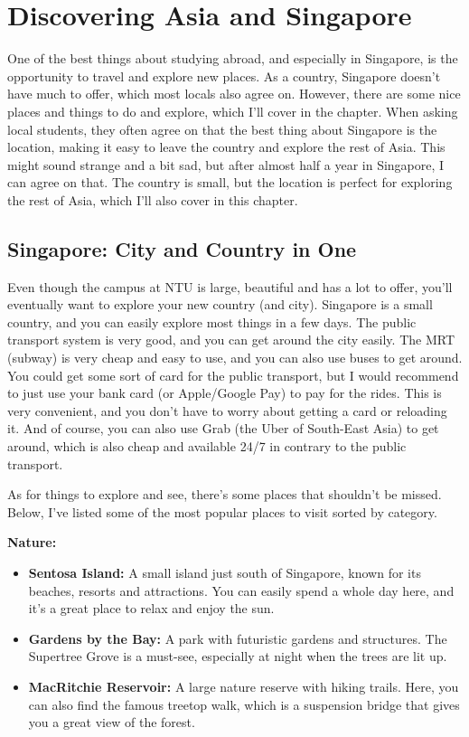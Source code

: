 \chapter*{Discovering Asia and Singapore}
\label{discover}

One of the best things about studying abroad, and especially in Singapore, is the opportunity to travel and explore new places. As a country, Singapore doesn't have much to offer, which most locals also agree on. However, there are some nice places and things to do and explore, which I'll cover in the chapter. When asking local students, they often agree on that the best thing about Singapore is the location, making it easy to leave the country and explore the rest of Asia. This might sound strange and a bit sad, but after almost half a year in Singapore, I can agree on that. The country is small, but the location is perfect for exploring the rest of Asia, which I'll also cover in this chapter.
\section*{Singapore: City and Country in One}
{}
Even though the campus at NTU is large, beautiful and has a lot to offer, you'll eventually want to explore your new country (and city). Singapore is a small country, and you can easily explore most things in a few days. The public transport system is very good, and you can get around the city easily. The MRT (subway) is very cheap and easy to use, and you can also use buses to get around. You could get some sort of card for the public transport, but I would recommend to just use your bank card (or Apple/Google Pay) to pay for the rides. This is very convenient, and you don't have to worry about getting a card or reloading it. And of course, you can also use Grab (the Uber of South-East Asia) to get around, which is also cheap and available 24/7 in contrary to the public transport.

As for things to explore and see, there's some places that shouldn't be missed. Below, I've listed some of the most popular places to visit sorted by category.

\textbf{Nature:}
\vspace{-0.5cm}
\begin{itemize}
    \item \textbf{Sentosa Island:} A small island just south of Singapore, known for its beaches, resorts and attractions. You can easily spend a whole day here, and it's a great place to relax and enjoy the sun.
    \item \textbf{Gardens by the Bay:} A park with futuristic gardens and structures. The Supertree Grove is a must-see, especially at night when the trees are lit up.
    \item \textbf{MacRitchie Reservoir:} A large nature reserve with hiking trails. Here, you can also find the famous treetop walk, which is a suspension bridge that gives you a great view of the forest.
\end{itemize}

